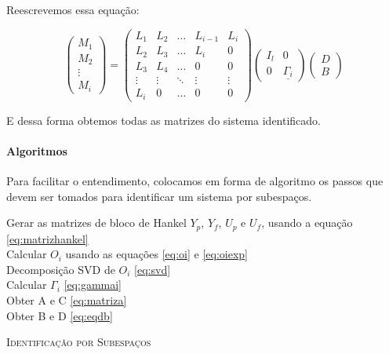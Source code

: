 Reescrevemos essa equação:

\begin{equation} \label{eq:eqdb}
\begin{pmatrix}
M_1\\M_2\\ \vdots \\ M_i
\end{pmatrix}
=
\begin{pmatrix}
L_1 &L_2& \dots & L_{i-1}& L_i\\
L_2& L_3 & \dots & L_i & 0\\
L_3 & L_4 & \dots & 0 & 0\\
\vdots & \vdots & \ddots & \vdots & \vdots\\
L_i & 0 & \dots & 0 &0
\end{pmatrix}
\begin{pmatrix}
I_l & 0 \\ 0 & \underline{\Gamma_i}
\end{pmatrix}
\begin{pmatrix}
D \\ B
\end{pmatrix}
\end{equation}

E dessa forma obtemos todas as matrizes do sistema identificado.

\paragraph{Algoritmos}\label{s:subalgoritmos}
Para facilitar o entendimento, colocamos em forma de algoritmo os passos que devem ser tomados para identificar um sistema por subespaços.

\IncMargin{1em}
\begin{algorithm}[H]
	\nl Gerar as matrizes de bloco de Hankel $Y_p$, $Y_f$, $U_p$ e $U_f$, usando a equação \eqref{eq:matrizhankel}\\
	\nl Calcular $O_i$ usando as equações \eqref{eq:oi} e \eqref{eq:oiexp}\\
	\nl Decomposição SVD de $O_i$ \eqref{eq:svd}\\
	\nl Calcular $\Gamma_i$ \eqref{eq:gammai}\\
	\nl Obter A e C \eqref{eq:matriza}\\
	\nl Obter B e D \eqref{eq:eqdb}\\
	\label{alg:sub}
	\caption{\textsc{Identificação por Subespaços}}
	
\end{algorithm}
\DecMargin{1em}

